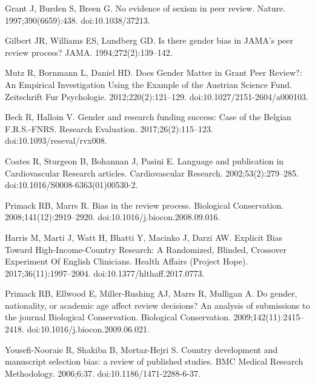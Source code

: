 \documentclass[10pt,letterpaper]{article}
\begin{document}
\begin{thebibliography}{100}
Grant J, Burden S, Breen G.
\newblock No evidence of sexism in peer review.
\newblock Nature. 1997;390(6659):438.
\newblock doi:{10.1038/37213}.

Gilbert JR, Williams ES, Lundberg GD.
\newblock Is there gender bias in {JAMA}'s peer review process?
\newblock JAMA. 1994;272(2):139--142.

Mutz R, Bornmann L, Daniel HD.
\newblock Does {Gender} {Matter} in {Grant} {Peer} {Review}?: {An} {Empirical}
  {Investigation} {Using} the {Example} of the {Austrian} {Science} {Fund}.
\newblock Zeitschrift Fur Psychologie. 2012;220(2):121--129.
\newblock doi:{10.1027/2151-2604/a000103}.

Beck R, Halloin V.
\newblock Gender and research funding success: {Case} of the {Belgian}
  {F}.{R}.{S}.-{FNRS}.
\newblock Research Evaluation. 2017;26(2):115--123.
\newblock doi:{10.1093/reseval/rvx008}.

Coates R, Sturgeon B, Bohannan J, Pasini E.
\newblock Language and publication in {Cardiovascular} {Research} articles.
\newblock Cardiovascular Research. 2002;53(2):279--285.
\newblock doi:{10.1016/S0008-6363(01)00530-2}.

Primack RB, Marrs R.
\newblock Bias in the review process.
\newblock Biological Conservation. 2008;141(12):2919--2920.
\newblock doi:{10.1016/j.biocon.2008.09.016}.

Harris M, Marti J, Watt H, Bhatti Y, Macinko J, Darzi AW.
\newblock Explicit {Bias} {Toward} {High}-{Income}-{Country} {Research}: {A}
  {Randomized}, {Blinded}, {Crossover} {Experiment} {Of} {English}
  {Clinicians}.
\newblock Health Affairs (Project Hope). 2017;36(11):1997--2004.
\newblock doi:{10.1377/hlthaff.2017.0773}.

Primack RB, Ellwood E, Miller-Rushing AJ, Marrs R, Mulligan A.
\newblock Do gender, nationality, or academic age affect review decisions? {An}
  analysis of submissions to the journal {Biological} {Conservation}.
\newblock Biological Conservation. 2009;142(11):2415--2418.
\newblock doi:{10.1016/j.biocon.2009.06.021}.

Yousefi-Nooraie R, Shakiba B, Mortaz-Hejri S.
\newblock Country development and manuscript selection bias: a review of
  published studies.
\newblock BMC Medical Research Methodology. 2006;6:37.
\newblock doi:{10.1186/1471-2288-6-37}.


\end{thebibliography}
\end{document}
